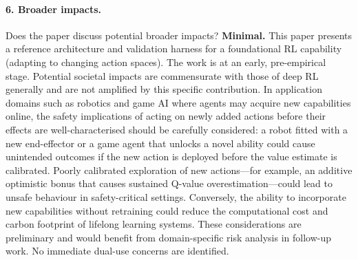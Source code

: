 \documentclass{article}
\begin{document}
\paragraph{6. Broader impacts.}
Does the paper discuss potential broader impacts?
\textbf{Minimal.} This paper presents a reference architecture and validation harness for a foundational RL capability (adapting to changing action spaces). The work is at an early, pre-empirical stage. Potential societal impacts are commensurate with those of deep RL generally and are not amplified by this specific contribution. In application domains such as robotics and game AI where agents may acquire new capabilities online, the safety implications of acting on newly added actions before their effects are well-characterised should be carefully considered: a robot fitted with a new end-effector or a game agent that unlocks a novel ability could cause unintended outcomes if the new action is deployed before the value estimate is calibrated. Poorly calibrated exploration of new actions---for example, an additive optimistic bonus that causes sustained Q-value overestimation---could lead to unsafe behaviour in safety-critical settings. Conversely, the ability to incorporate new capabilities without retraining could reduce the computational cost and carbon footprint of lifelong learning systems. These considerations are preliminary and would benefit from domain-specific risk analysis in follow-up work. No immediate dual-use concerns are identified.
\end{document}
